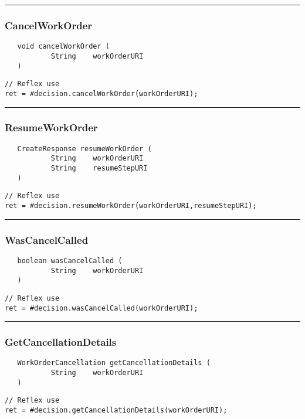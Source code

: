 \rule{15cm}{2pt}
\subsubsection{CancelWorkOrder}
\label{Api:CancelWorkOrder}
\begin{verbatim}
   void cancelWorkOrder (
           String    workOrderURI
   )
\end{verbatim}
\begin{lstlisting}[language=reflex]
// Reflex use
ret = #decision.cancelWorkOrder(workOrderURI);
\end{lstlisting}



\rule{15cm}{2pt}
\subsubsection{ResumeWorkOrder}
\label{Api:ResumeWorkOrder}
\begin{verbatim}
   CreateResponse resumeWorkOrder (
           String    workOrderURI
           String    resumeStepURI
   )
\end{verbatim}
\begin{lstlisting}[language=reflex]
// Reflex use
ret = #decision.resumeWorkOrder(workOrderURI,resumeStepURI);
\end{lstlisting}



\rule{15cm}{2pt}
\subsubsection{WasCancelCalled}
\label{Api:WasCancelCalled}
\begin{verbatim}
   boolean wasCancelCalled (
           String    workOrderURI
   )
\end{verbatim}
\begin{lstlisting}[language=reflex]
// Reflex use
ret = #decision.wasCancelCalled(workOrderURI);
\end{lstlisting}



\rule{15cm}{2pt}
\subsubsection{GetCancellationDetails}
\label{Api:GetCancellationDetails}
\begin{verbatim}
   WorkOrderCancellation getCancellationDetails (
           String    workOrderURI
   )
\end{verbatim}
\begin{lstlisting}[language=reflex]
// Reflex use
ret = #decision.getCancellationDetails(workOrderURI);
\end{lstlisting}



